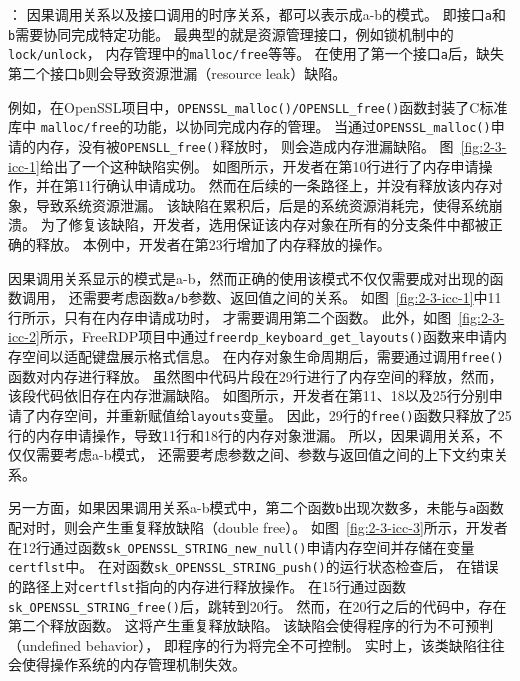 \vspace*{10pt}
：
因果调用关系以及接口调用的时序关系，都可以表示成a-b的模式。
即接口\texttt{a}和\texttt{b}需要协同完成特定功能。
最典型的就是资源管理接口，例如锁机制中的\texttt{lock/unlock}，
内存管理中的\texttt{malloc/free}等等。
在使用了第一个接口\texttt{a}后，缺失第二个接口\texttt{b}则会导致资源泄漏（resource leak）缺陷。



例如，在OpenSSL项目中，\texttt{OPENSSL\_malloc()/OPENSLL\_free()}函数封装了C标准库中
\texttt{malloc/free}的功能，以协同完成内存的管理。
当通过\texttt{OPENSSL\_malloc()}申请的内存，没有被\texttt{OPENSLL\_free()}释放时，
则会造成内存泄漏缺陷。
图~\ref{fig:2-3-icc-1}给出了一个这种缺陷实例。
如图所示，开发者在第10行进行了内存申请操作，并在第11行确认申请成功。
然而在后续的一条路径上，并没有释放该内存对象，导致系统资源泄漏。
该缺陷在累积后，后是的系统资源消耗完，使得系统崩溃。
为了修复该缺陷，开发者，选用保证该内存对象在所有的分支条件中都被正确的释放。
本例中，开发者在第23行增加了内存释放的操作。



因果调用关系显示的模式是a-b，然而正确的使用该模式不仅仅需要成对出现的函数调用，
还需要考虑函数\texttt{a/b}参数、返回值之间的关系。
如图~\ref{fig:2-3-icc-1}中11行所示，只有在内存申请成功时，
才需要调用第二个函数。
此外，如图~\ref{fig:2-3-icc-2}所示，FreeRDP项目中通过\texttt{freerdp\_keyboard\_get\_layouts()}函数来申请内存空间以适配键盘展示格式信息。
在内存对象生命周期后，需要通过调用\texttt{free()}函数对内存进行释放。
虽然图中代码片段在29行进行了内存空间的释放，然而，该段代码依旧存在内存泄漏缺陷。
如图所示，开发者在第11、18以及25行分别申请了内存空间，并重新赋值给\texttt{layouts}变量。
因此，29行的\texttt{free()}函数只释放了25行的内存申请操作，导致11行和18行的内存对象泄漏。
所以，因果调用关系，不仅仅需要考虑a-b模式，
还需要考虑参数之间、参数与返回值之间的上下文约束关系。

另一方面，如果因果调用关系a-b模式中，第二个函数\texttt{b}出现次数多，未能与\texttt{a}函数配对时，则会产生重复释放缺陷（double free）。
如图~\ref{fig:2-3-icc-3}所示，开发者在12行通过函数\texttt{sk\_OPENSSL\_STRING\_new\_null()}申请内存空间并存储在变量\texttt{certflst}中。
在对函数\texttt{sk\_OPENSSL\_STRING\_push()}的运行状态检查后，
在错误的路径上对\texttt{certflst}指向的内存进行释放操作。
在15行通过函数\texttt{sk\_OPENSSL\_STRING\_free()}后，跳转到20行。
然而，在20行之后的代码中，存在第二个释放函数。
这将产生重复释放缺陷。
该缺陷会使得程序的行为不可预判（undefined behavior），
即程序的行为将完全不可控制。
实时上，该类缺陷往往会使得操作系统的内存管理机制失效。

